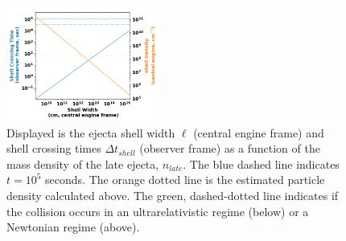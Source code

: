 \documentclass[linenumbers,twocolumn]{aastex631}
\begin{document}
\begin{figure}[t!]
    \centering
    \includegraphics[width=0.45\textwidth]{shell-cross-time.png}
    \caption{Displayed is the ejecta shell width $\ell$ (central engine frame) and shell crossing times $\Delta t_{shell}$ (observer frame) as a function of the mass density of the late ejecta, $n_{late}$. The blue dashed line indicates $t=10^5$ seconds. The orange dotted line is the estimated particle density calculated above. The green, dashed-dotted line indicates if the collision occurs in an ultrarelativistic regime (below) or a Newtonian regime (above).}
    \label{fig: plot}
\end{figure}
\end{document}
